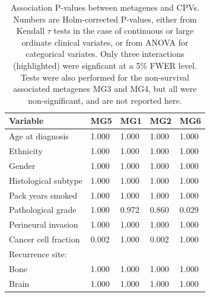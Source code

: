 \documentclass[dissertation.tex]{subfiles}
\begin{document}
\begin{table}[h]
\centering
\caption{Association P-values between metagenes and \glspl{CPV}.  Numbers are Holm-corrected P-values, either from Kendall $\tau$ tests in the case of continuous or large ordinate clinical variates, or from ANOVA for categorical variates.  Only three interactions (highlighted) were signficant at a 5\% FWER level.  Tests were also performed for the non-survival associated metagenes MG3 and MG4, but all were non-significant, and are not reported here.\label{tab:sigs-mg-cpvs}}
\begin{tabular}{@{}lllll@{}}
\toprule
Variable                   & MG5                           & MG1   & MG2                           & MG6                           \\ \midrule
Age at diagnosis           & 1.000                         & 1.000 & 1.000                         & 1.000                         \\
Ethnicity                  & 1.000                         & 1.000 & 1.000                         & 1.000                         \\
Gender                     & 1.000                         & 1.000 & 1.000                         & 1.000                         \\
Histological subtype       & 1.000                         & 1.000 & 1.000                         & 1.000                         \\
Pack years smoked          & 1.000                         & 1.000 & 1.000                         & 1.000                         \\
Pathological grade         & 1.000                         & 0.972 & 0.860                         & \cellcolor[HTML]{C0C0C0}0.029 \\
Perineural invasion        & 1.000                         & 1.000 & 1.000                         & 1.000                         \\
Cancer cell fraction       & \cellcolor[HTML]{C0C0C0}0.002 & 1.000 & \cellcolor[HTML]{C0C0C0}0.002 & 1.000                         \\
Recurrence site:           &                               &       &                               &                               \\
\quad Bone                       & 1.000                         & 1.000 & 1.000                         & 1.000                         \\
\quad Brain                      & 1.000                         & 1.000 & 1.000                         & 1.000                         \\

\end{tabular}
\end{table}
\end{document}
